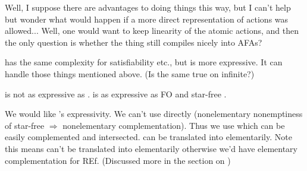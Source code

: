 Well, I suppose there are advantages to doing things this way, but I can't help but wonder
what would happen if a more direct representation of actions was allowed...
Well, one would want to keep linearity of the atomic actions,
and then the only question is whether the thing still compiles nicely into AFAs?


\ldlf has the same complexity for satisfiability etc., but is more expressive. It can handle those things mentioned above. (Is the same true on infinite?)

\ltlf is not as expressive as .
\ltlf is as expressive as FO and star-free .

We would like 's expressivity.
We can't use  directly (nonelementary nonemptiness of star-free  $\Rightarrow$ nonelementary complementation).
Thus we use \ldlf which can be easily complemented and intersected.
\ldlf can be translated into  elementarily.
Note this means  can't be translated into  elementarily otherwise we'd have elementary complementation for REf.
(Discussed more in the section on \ldlf)
